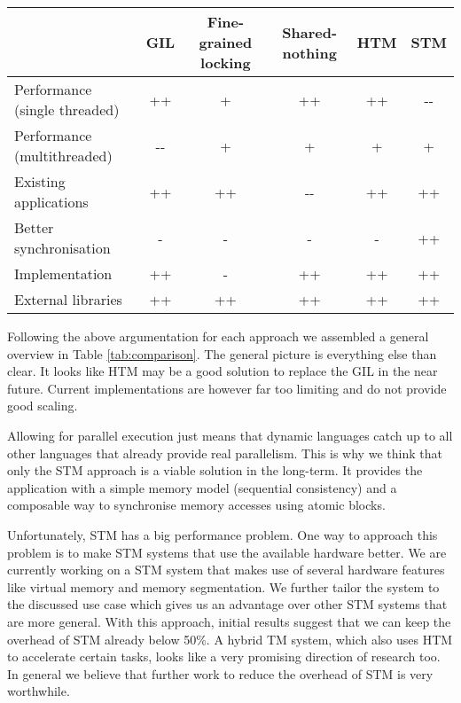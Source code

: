 \documentclass{sigplanconf}
\begin{document}
\begin{table*}[!ht]
  \centering
  \begin{tabular}{|l|c|c|c|c|c|}
    \hline
    & \textbf{GIL} & \textbf{Fine-grained locking}
    & \textbf{Shared-nothing} & \textbf{HTM} & \textbf{STM}\\
    \hline
    Performance (single threaded) & ++   & +  & ++   & ++ & -{-} \\
    \hline
    Performance (multithreaded)   & -{-} & +  & +    & +  & +    \\
    \hline
    Existing applications         & ++   & ++ & -{-} & ++ & ++   \\
    \hline
    Better synchronisation        & -    & -  & -    & -  & ++   \\
    \hline
    Implementation                & ++   & -  & ++   & ++ & ++   \\
    \hline
    External libraries            & ++   & ++ & ++   & ++ & ++   \\
    \hline
  \end{tabular}
  \caption{Comparison between the approaches (-{-}/-/o/+/++)}
  \label{tab:comparison}
\end{table*}


Following the above argumentation for each approach we assembled a
general overview in Table \ref{tab:comparison}. The general picture is
everything else than clear. It looks like HTM may be a good solution
to replace the GIL in the near future. Current implementations are
however far too limiting and do not provide good scaling.

Allowing for parallel execution just means that dynamic languages
catch up to all other languages that already provide real
parallelism. This is why we think that only the STM approach is a
viable solution in the long-term. It provides the application with a
simple memory model (sequential consistency) and a composable way to
synchronise memory accesses using atomic blocks.

Unfortunately, STM has a big performance problem. One way to approach
this problem is to make STM systems that use the available hardware
better. We are currently working on a STM system that makes use of
several hardware features like virtual memory and memory segmentation.
We further tailor the system to the discussed use case which gives us
an advantage over other STM systems that are more general.  With this
approach, initial results suggest that we can keep the overhead of STM
already below 50\%. A hybrid TM system, which also uses HTM to
accelerate certain tasks, looks like a very promising direction of
research too. In general we believe that further work to reduce the
overhead of STM is very worthwhile.
\end{document}
